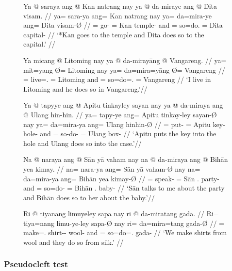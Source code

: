 \begin{figure}
\pex\label{ex:compltrdoso}
\a\label{ex:compltrdoso_1}%
\ljudge*\begingl
	\gla Ya @ saraya ang @ Kan natrang nay ya @ da-miraye ang @ Dita
		visam. //
	\glb ya= sara-ya ang= Kan natrang nay ya= da=mira-ye ang= Dita 
		visam-Ø //
	\glc \LocT{}= go-\TsgM{} \Aarg{}= Kan temple-\Top{} and \LocT{}= 
		so=do.\TsgF{} \Aarg{}= Dita capital-\Top{} //
	\glft `*Kan goes to the temple and Dita does so to the capital.' //
\endgl

\a\label{ex:compltrdoso_2}%
\ljudge*\begingl
	\gla Ya micang {} @ Litoming nay ya @ da-mirayāng {} @ Vangareng. //
	\glb ya= mit=yang Ø= Litoming nay ya= da=mira=yāng Ø= Vangareng //
	\glc \LocT{}= live=\Fsg{}.\Aarg{} \Top{}= Litoming and \LocT{}=
		so=do=\TsgM{}.\Aarg{} \Top{}= Vangareng //
	\glft `\ques{}I live in Litoming and he does so in Vangareng.'//
\endgl

\a\label{ex:compltrdoso_3}%
\ljudge*\begingl
	\gla Ya @ tapyye ang @ Apitu tinkayley sayan nay ya @ da-miraya ang @ 
		Ulang hin-hin. //
	\glb ya= tapy-ye ang= Apitu tinkay-ley sayan-Ø nay ya= da=mira-ya ang=
		Ulang hin\til{}hin-Ø //
	\glc \LocT{}= put-\TsgF{} \Aarg{}= Apitu key-\PargI{} hole-\Top{} and
		\LocT{}= so-do-\TsgM{} \Aarg{}= Ulang box\til{}\Dim{}-\Top{} //
	\glft `Apitu puts the key into the hole and Ulang does so into the case.'//
\endgl

\a\label{ex:compltrdoso_4}%
\ljudge*\begingl
	\gla Na @ naraya ang @ Sān yā vaham nay na @ da-miraya ang @ Bihān yea
		kimay. //
	\glb na= nara-ya ang= Sān yā vaham-Ø nay na= da=mira-ya ang= Bihān yea
		kimay-Ø //
	\glc \GenT{}= speak-\TsgM{} \Aarg{}= Sān \Fsg{}.\Loc{} party-\Top{}
		and \GenT{}= so=do-\TsgM{} \Aarg{}= Bihān \TsgF{}.\Loc{}
		baby-\Top{} //
	\glft `\ques{}Sān talks to me about the party and Bihān does so to her about the
		baby.'//
\endgl

\a\label{ex:compltrdoso_5}%
\ljudge*\begingl
	\gla Ri @ tiyanang limuyeley sapa nay ri @ da-miratang gada. //
	\glb Ri= tiya=nang limu-ye-ley sapa-Ø nay ri= da=mira=tang gada-Ø //
	\glc \InsT{}= make=\Fpl{}.\Aarg{} shirt-\Pl{}-\PargI{} wool-\Top{} and
		\InsT{}= so=do=\TplM{}.\Aarg{} gada-\Top{} //
	\glft `\ques{}We make shirts from wool and they do so from silk.' //
\endgl

\xe
\end{figure}

\subsubsection{Pseudocleft test}


